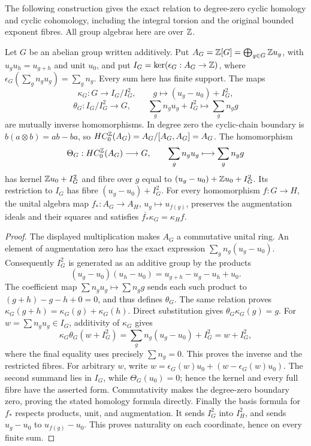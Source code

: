 The following construction gives the exact relation to degree-zero cyclic
homology and cyclic cohomology, including the integral torsion and the
original bounded exponent fibres. All group algebras here are over \(\mathbb Z\).

\begin{lemma}
\label{lem:integral-augmentation}
Let \(G\) be an abelian group written additively. Put
\(A_G=\mathbb Z[G]=\bigoplus_{g\in G}\mathbb Z u_g\), with
\(u_gu_h=u_{g+h}\) and unit \(u_0\), and put
\(I_G=\ker(\epsilon_G:A_G\to\mathbb Z)\), where
\(\epsilon_G(\sum_g n_gu_g)=\sum_g n_g\).
Every sum here has finite support. The maps
\[
 \kappa_G:G\longrightarrow I_G/I_G^2,
 \qquad g\longmapsto (u_g-u_0)+I_G^2,
\]
\[
 \theta_G:I_G/I_G^2\longrightarrow G,
 \qquad \sum_g n_gu_g+I_G^2\longmapsto\sum_g n_gg
\]
are mutually inverse homomorphisms. In degree zero the cyclic-chain
boundary is \(b(a\otimes b)=ab-ba\), so
\(HC_0^{\mathbb Z}(A_G)=A_G/[A_G,A_G]=A_G\). The homomorphism
\[
 \Theta_G:HC_0^{\mathbb Z}(A_G)\longrightarrow G,
 \qquad \sum_g n_gu_g\longmapsto\sum_g n_gg
\]
has kernel \(\mathbb Z u_0+I_G^2\) and fibre over \(g\) equal to
\((u_g-u_0)+\mathbb Z u_0+I_G^2\). Its restriction to \(I_G\) has
fibre \((u_g-u_0)+I_G^2\).
For every homomorphism \(f:G\to H\), the unital algebra map
\(f_*:A_G\to A_H\), \(u_g\mapsto u_{f(g)}\), preserves the
augmentation ideals and their squares and satisfies
\(\overline{f_*}\kappa_G=\kappa_H f\).
\end{lemma}
\begin{proof}
The displayed multiplication makes \(A_G\) a commutative unital ring.
An element of augmentation zero has the exact expression
\(\sum_g n_g(u_g-u_0)\). Consequently \(I_G^2\) is generated
as an additive group by the products
\[
 (u_g-u_0)(u_h-u_0)=u_{g+h}-u_g-u_h+u_0.
\]
The coefficient map \(\sum n_gu_g\mapsto\sum n_gg\) sends each
such product to \((g+h)-g-h+0=0\), and thus defines \(\theta_G\).
The same relation proves
\(\kappa_G(g+h)=\kappa_G(g)+\kappa_G(h)\).
Direct substitution gives \(\theta_G\kappa_G(g)=g\).
For \(w=\sum n_gu_g\in I_G\), additivity of \(\kappa_G\) gives
\[
 \kappa_G\theta_G(w+I_G^2)
 =\sum_g n_g(u_g-u_0)+I_G^2=w+I_G^2,
\]
where the final equality uses precisely \(\sum n_g=0\).
This proves the inverse and the restricted fibres. For arbitrary \(w\),
write \(w=\epsilon_G(w)u_0+(w-\epsilon_G(w)u_0)\). The second
summand lies in \(I_G\), while \(\Theta_G(u_0)=0\); hence the
kernel and every full fibre have the asserted form. Commutativity makes
the degree-zero boundary zero, proving the stated homology formula
directly. Finally the basis formula for \(f_*\) respects products,
unit, and augmentation. It sends \(I_G^2\) into \(I_H^2\),
and sends \(u_g-u_0\) to \(u_{f(g)}-u_0\). This proves naturality
on each coordinate, hence on every finite sum.
\end{proof}

